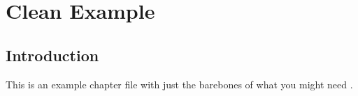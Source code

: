 \chapter{Clean Example}
\label{cha:clean-example}

\section{Introduction}
\label{sec:another-intro}

This is an example chapter file with just the barebones of what you might need \autocite{Einstein1906}.

\newpage
\printbibliography[heading=subbibnumbered, segment=\therefsegment]
